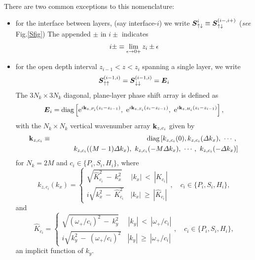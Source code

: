 There are  two common exceptions to this 
nomenclature:
\begin{itemize}
\item for the interface between layers, (say interface-$i$) we write
${\mbox{\boldmath$\mit S$\unboldmath}}_{\uparrow\downarrow }^{i}\equiv {\mbox{\boldmath$\mit S$\unboldmath}}_{\uparrow\downarrow }^{(i-,i+)}$
({\em see\/} Fig.\ref{Sfig}) 
The appended $\pm$ in $i\pm$ indicates
\[
i \pm \equiv  
\lim\limits_{\rm \epsilon\rightarrow 0+} {z}_{i} \pm \epsilon 
\] 

\item for the open  depth interval $z_{i-1} < z < z_{i}$  spanning a single 
layer, we write 
\[{\mbox{\boldmath$\mit S$\unboldmath}}_{\uparrow\uparrow }^{(i-1,i)}=
{\mbox{\boldmath$\mit S$\unboldmath}}_{\downarrow\downarrow }^{(i-1,i)}={\mbox{\boldmath$\mit E$\unboldmath}}_{i}
\]
The $3 N_k\times 3 N_k$ diagonal, plane-layer phase shift array is defined as
\begin{equation} \label{Ejdef}
{\mbox{\boldmath$\mit E$\unboldmath}}_{i}=\mbox{diag} \left[{\rm e}^{i {\bf  k}_{z, 
P_{i} }(z_{i}-z_{i-1})},\  {\rm e}^{i 
{\bf  k}_{z, S_{i} }(z_{i}-z_{i-1})}
,\  {\rm e}^{i 
{\bf  k}_{z, H_{i} }(z_{i}-z_{i-1})}\right] ,
\end{equation} 
with the $N_k \times N_k$ vertical wavenumber array ${\bf  k}_{z, c_{i} }$ given by
\begin{eqnarray} \label{kzidef} 
{\bf  k}_{z, c_{i} }&\equiv& \mbox{diag}\left[ {k}_{z, c_{i} }(0 ),
{k}_{z, c_{i} }({\mit 
\Delta}k_x),\ \cdots,\right.\nonumber\\
&&\qquad\left. \ {k}_{z, c_{i} }((M-1) {\mit \Delta}k_x)
, \ {k}_{z, c_{i} }(-M {\mit \Delta}k_x)
,\ \cdots, \ {k}_{z, c_{i} }(- {\mit \Delta}k_x) \right]
\end{eqnarray}
for $N_k=2 M$ and $c_i\in \{P_i,S_i, H_i \}$,
where 
\begin{equation}	\label{kzc1Def}
	{k}_{z,c_i}({k}_{x}) = \left\{
	\begin{array}{c}
	\sqrt {\hat{ K}_{c_i}^{2}\ -\ {k}_{x}^{2}}\ \ \ \ \ \ |{k}_{x}|\ <\ 
	|\hat{K}_{c_i}|\\
	i\sqrt {{k}_{x}^{ 2}\ -\ \hat{ K}_{c_i}^{2}} \ \ \ \ |{k}_{x}|\ \ge   \ 
	|\hat{K}_{c_i}|
\end{array}
\right. , \quad  c_i\in\{P_i,S_i,H_i\}, 
\end{equation}
and
\begin{equation}	\label{K1def}
	\hat{K}_{c_i} = \left\{
	\begin{array}{c}
	\sqrt {(\omega_+/{c_i})^{2}\ -\ {k}_{y}^{2}}\ \ \ \ \ \ |{k}_{y}|\ <\ 
	|\omega_+/{c_i}|\\
	i\sqrt {{k}_{y}^{ 2}\ -\ (\omega_+/{c_i})^{2}} \ \ \ \ |{k}_{y}|\ \ge   \ 
	|\omega_+/{c_i}|
\end{array} \right. , \quad  c_i\in\{P_i,S_i,H_i\}, 
\end{equation}
an implicit function of $k_y$.
\end{itemize}


